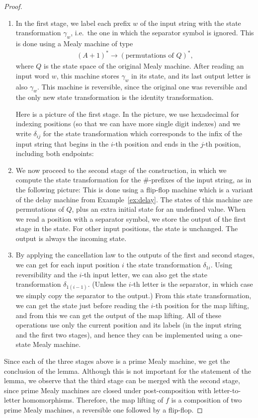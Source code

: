 \begin{proof}
    \begin{enumerate}
        \item  In the first stage, we label each prefix $w$ of the input string with the state transformation $\gamma_w$, i.e.~the one in which the separator symbol is ignored. This is done using a Mealy machine of type 
        \begin{align*}
        (A+1)^* \to (\text{permutations of $Q$})^*,
        \end{align*}
        where $Q$ is the state space  of the original Mealy machine. After reading an input word $w$, this machine stores $\gamma_w$ in its state, and its last output letter is also $\gamma_w$. This machine is reversible,  since the original one was reversible and the only new state transformation is the identity transformation. 
        
        Here is  a picture of the first stage. In the picture, we use hexadecimal for indexing positions (so that we can have more  single digit indexes) and we write  $\delta_{ij}$ for the state transformation which corresponds to the infix of the input string that begins in the $i$-th position and ends in the $j$-th position, including both endpoints:
        \item We now proceed to the second stage of the construction, in which we compute the state transformation for the $\#$-prefixes of the input string, as in the following picture:
        This is done using a flip-flop machine which is a  variant of the delay machine from Example~\ref{ex:delay}. The states of this machine are permutations of $Q$, plus an extra initial state for an undefined value. When we read a position with a separator symbol, we store the output of the first stage in the state. For other input positions, the state is unchanged. The output is always the incoming state. 
        \item By applying the cancellation law to the outputs of the first and second stages, we can get for each input position $i$ the state transformation $\delta_{1i}$. Using reversibility and the $i$-th input letter, we can also get the state transformation $\delta_{1(i-1)}$. (Unless the $i$-th letter is the separator, in which case we simply copy the separator to the output.) From this state transformation, we can get the state just before reading the $i$-th position for the map lifting, and from this we can get the output of the map lifting. All of these operations use only the current position and its labels (in the input string and the first two stages), and hence they can be implemented using a one-state Mealy machine.
    \end{enumerate}
    Since each of the three stages above is a prime Mealy machine, we get the conclusion of the lemma. Although this is not important for the statement of the lemma, we observe that the third stage can be merged with the second stage, since prime Mealy machines are closed under post-composition with letter-to-letter homomorphisms. Therefore, the map lifting of $f$ is a composition of two prime Mealy machines, a reversible one followed by a flip-flop.
\end{proof}

